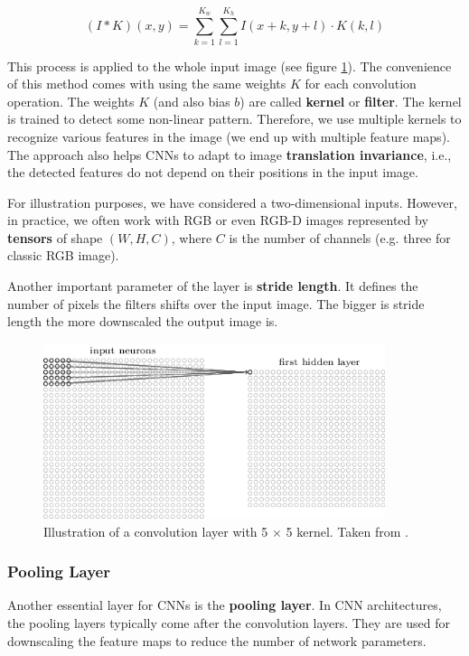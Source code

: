     $$
        (I * K)(x, y) = \sum\limits_{k = 1}^{K_w}\sum\limits_{l = 1}^{K_h}
        I(x + k, y + l) \cdot K(k, l)
    $$

    This process is applied to the whole input image (see figure
    \ref{fig:convolution}). The convenience of this method comes with using the same
    weights $K$ for each convolution operation. The weights $K$ (and also bias $b$)
    are called \textbf{kernel} or \textbf{filter}. The kernel is trained to detect
    some non-linear pattern. Therefore, we use multiple kernels to recognize
    various features in the image (we end up with multiple feature maps). The
    approach also helps CNNs to adapt to image \textbf{translation invariance},
    i.e., the detected features do not depend on their positions in the input
    image.

    For illustration purposes, we have considered a two-dimensional inputs. However,
    in practice, we often work with RGB or even RGB-D images represented by
    \textbf{tensors} of shape $(W, H, C)$, where $C$ is the number of channels (e.g.
    three for classic RGB image).

    Another important parameter of the layer is \textbf{stride length}. It defines
    the number of pixels the filters shifts over the input image. The bigger is
    stride length the more downscaled the output image is.

    \begin{figure}[h]
        \centering
        \includegraphics[width=10cm]{Sources/Figures/convolution.png}
        \caption{Illustration of a convolution layer with 5 $\times$ 5 kernel. Taken
            from \cite{nielsenneural}.}
        \label{fig:convolution}
    \end{figure}

    \subsubsection{Pooling Layer}
    Another essential layer for CNNs is the \textbf{pooling layer}. In CNN
    architectures, the pooling layers typically come after the convolution layers.
    They are used for downscaling the feature maps to reduce the number of network
    parameters.


